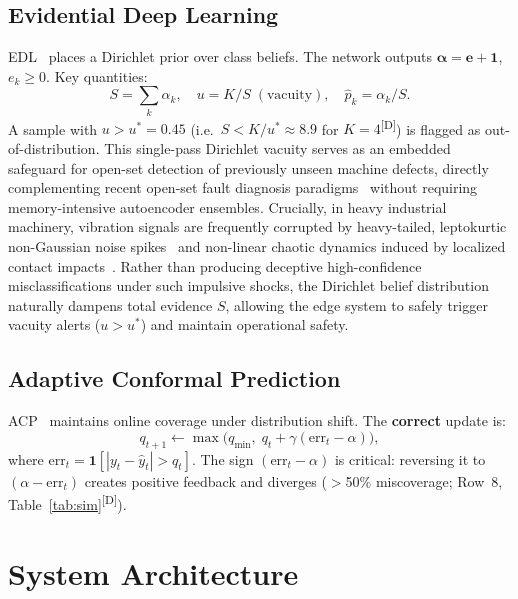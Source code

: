 \documentclass[conference]{IEEEtran}
\newcommand{\evD}{\textsuperscript{\textcolor{derived}{[D]}}\xspace}
\begin{document}
\subsection{Evidential Deep Learning}
\label{sec:edl}

EDL~\cite{sensoy2018evidential} places a Dirichlet prior over class
beliefs.
The network outputs $\bm{\alpha}=\bm{e}+\mathbf{1}$, $e_k\ge 0$.
Key quantities:
\begin{equation}
  S=\textstyle\sum_k\alpha_k,\quad
  u=K/S\;(\text{vacuity}),\quad
  \hat{p}_k=\alpha_k/S.
  \label{eq:edl}
\end{equation}
A sample with $u>u^*=0.45$
(i.e.\ $S<K/u^*\approx 8.9$ for $K=4$\evD)
is flagged as out-of-distribution.
This single-pass Dirichlet vacuity serves as an embedded safeguard for open-set
detection of previously unseen machine defects, directly complementing recent
open-set fault diagnosis paradigms~\cite{xu2026openset} without requiring memory-intensive
autoencoder ensembles.
Crucially, in heavy industrial machinery, vibration signals are frequently corrupted by
heavy-tailed, leptokurtic non-Gaussian noise spikes~\cite{yazdanianasr2026leptokurtic}
and non-linear chaotic dynamics induced by localized contact impacts~\cite{almeida2026chaos}.
Rather than producing deceptive high-confidence misclassifications under such impulsive shocks,
the Dirichlet belief distribution naturally dampens total evidence $S$, allowing the edge system to
safely trigger vacuity alerts ($u > u^*$) and maintain operational safety.

\subsection{Adaptive Conformal Prediction}
\label{sec:acp_bg}

ACP~\cite{gibbs2021adaptive} maintains online coverage under
distribution shift. The \textbf{correct} update is:
\begin{equation}
  \boxed{q_{t+1}\leftarrow
    \max\!\bigl(q_\mathrm{min},\;
    q_t+\gamma(\mathrm{err}_t-\alpha)\bigr)},
  \label{eq:acp_update}
\end{equation}
where $\mathrm{err}_t=\mathbf{1}[|y_t-\hat{y}_t|>q_t]$.
The sign $(\mathrm{err}_t{-}\alpha)$ is critical:
reversing it to $(\alpha{-}\mathrm{err}_t)$ creates positive feedback
and diverges ($>$50\% miscoverage; Row~8, Table~\ref{tab:sim}\evD).

\section{System Architecture}
\label{sec:arch}
\end{document}
